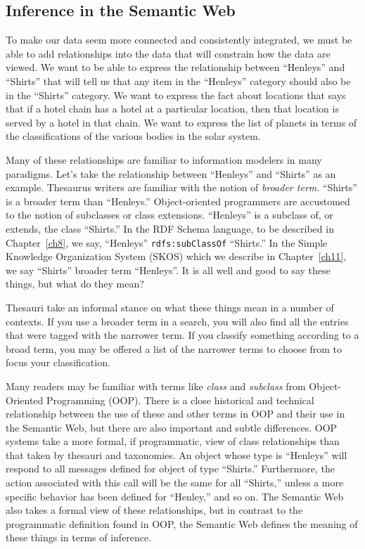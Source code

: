 \subsection{Inference in the Semantic Web}

To make our data seem more connected and consistently integrated, we
must be able to add relationships into the data that will constrain how
the data are viewed. We want to be able to express the relationship
between ``Henleys'' and ``Shirts'' that will tell us that any item in
the ``Henleys'' category should also be in the ``Shirts'' category. We
want to express the fact about locations that says that if a hotel chain
has a hotel at a particular location, then that location is served by a
hotel in that chain. We want to express the list of planets in terms of
the classifications of the various bodies in the solar system.

Many of these relationships are familiar to information modelers in many
paradigms. Let's take the relationship between ``Henleys'' and
``Shirts'' as an example. Thesaurus writers are familiar with the notion
of \emph{broader term}. ``Shirts'' is a broader term than ``Henleys.''
Object-oriented programmers are accustomed to the notion of subclasses
or class extensions. ``Henleys'' is a subclass of, or extends, the class
``Shirts.'' In the RDF Schema language, to be described in Chapter~\ref{ch8}, we say, ``Henleys'' \texttt{rdfs:subClassOf} ``Shirts.''  
In the Simple Knowledge Organization System (SKOS) which we describe in Chapter~\ref{ch11}, we say ``Shirts'' broader term ``Henleys''. 
It is all well and
good to say these things, but what do they mean?

Thesauri take an informal stance on what these things mean in a number
of contexts. If you use
a broader term in a search, you will also find all the entries that were
tagged with the narrower term. If you classify something according to a
broad term, you may be offered a list of the narrower terms to choose
from to focus your classification.

\begin{sidebar}{}
Many readers may be familiar with terms like \emph{class} and
\emph{subclass} from Object-Oriented Programming (OOP). There is a close
historical and technical relationship between the use of these and other
terms in OOP and their use in the Semantic Web, but there are also
important and subtle differences. OOP systems take a more formal, if
programmatic, view of class relationships than that taken by thesauri
and taxonomies. An object whose type is ``Henleys'' will respond to all
messages defined for object of type ``Shirts.'' Furthermore, the action
associated with this call will be the same for all ``Shirts,'' unless a
more specific behavior has been defined for ``Henley,'' and so on. The
Semantic Web also takes a formal view of these relationships, but in
contrast to the programmatic definition found in OOP, the Semantic Web
defines the meaning of these things in terms of inference.
\end{sidebar}


